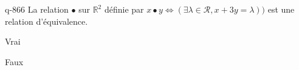 \begin{truefalse}{q-866}
La relation $\bullet$ sur $\mathbb R^2$ définie par $x\bullet y \iff (\exists \lambda\in\mathcal R, x+3y=\lambda))$ est une relation d'équivalence.
\item* Vrai
\item Faux
\end{truefalse}

